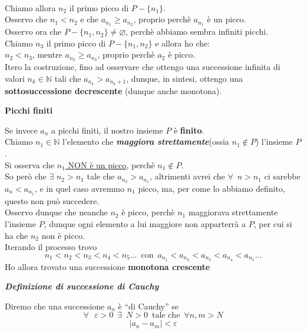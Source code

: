 \documentclass{article}
\theoremstyle{definition}
\newcommand{\virgolette}[1]{``#1''}
\begin{document}
    \\
    Chiamo allora $n_2$ il primo picco di $P-\{n_1\}$.
    \\
    Osservo che $n_1<n_2$ e che $a_{n_1} \geqslant a_{n_2}$, proprio perchè $a_{n_1}$ è un picco.
    \\
    Osservo ora che $P-\{n_1,n_2\}\neq \varnothing$, perchè abbiamo sembra infiniti picchi.
    \\
    Chiamo $n_3$ il primo picco di $P-\{n_1,n_2\}$ e allora ho che:
    \\
    $n_2<n_3$, mentre $a_{n_2}\geqslant a_{n_3}$, proprio perchè $a_2$ è picco.
    \\
    Itero la costruzione, fino ad osservare che ottengo una successione infinita di valori $n_k \in \mathbb{N}$ tali che $a_{n_k}>a_{n_k+1}$, dunque, in sintesi, ottengo una \textbf{sottosuccessione decrescente} (dunque anche monotona).
\begin{center}
\textbf{Picchi finiti}
\end{center}
Se invece $a_n$ a picchi finiti, il nostro insieme $P$ è \textbf{finito}.
\\
Chiamo $n_1 \in \mathbb{N}$ l'elemento che \textbf{\textit{maggiora strettamente}}(ossia $n_1 \notin P$) l'insieme $P$.
\\
Si osserva che \underline{$n_1$ NON è un picco}, perchè $n_1 \notin P$.
\\
So però che $\exists$ $n_2 >n_1$ tale che $a_{n_2}>a_{n_1}$, altrimenti avrei che $\forall \,\,\, n>n_1$ ci sarebbe $a_{n}<a_{n_1}$, e in quel caso avremmo $n_1$ picco, ma, per come lo abbiamo definito, questo non può succedere.
\\
Osservo dunque che neanche $n_2$ è picco, perchè $n_1$ maggiorava strettamente l'insieme $P$, dunque ogni elemento a lui maggiore non apparterrà a $P$, per cui si ha che $n_2$ non è picco.
\\
Iterando il processo trovo
\begin{equation}
    n_1<n_2<n_3<n_4<n_5... \,\,\, \mbox{con} \,\,\, a_{n_1}<a_{n_2}<a_{n_3}<a_{n_4}<a_{n_5}...
\end{equation}
Ho allora trovato una successione \textbf{monotona crescente}

\begin{center}
   \textbf{\textit{ Definizione di successione di Cauchy}}
\end{center}
Diremo che una successione $a_n$ è \virgolette{di Cauchy} se
\begin{equation}
    \forall \,\,\,\, \varepsilon >0 \,\,\, \exists \,\,\, N>0 \,\,\,\mbox{tale che}\,\,\, \forall n,m>N
\end{equation}
\begin{equation}
    |a_n-a_m|<\varepsilon
\end{equation}
\end{document}
